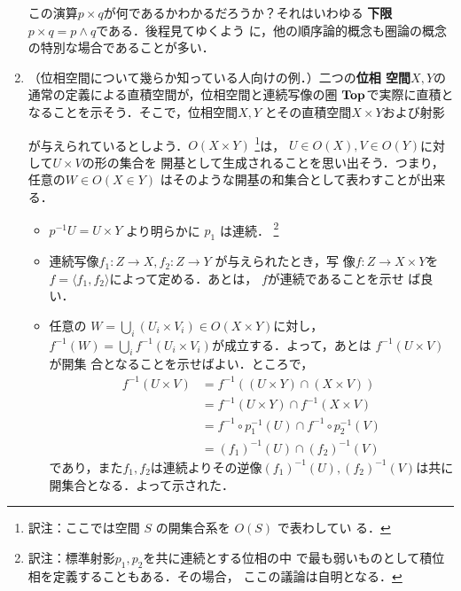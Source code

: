 \begin{enumerate}
       この演算$p\times q$が何であるかわかるだろうか？それはいわゆる
       {\bfseries 下限}$p\times q = p \wedge q$である．後程見てゆくよう
       に，他の順序論的概念も圏論の概念の特別な場合であることが多い．
 \item （位相空間について幾らか知っている人向けの例．）二つの{\bfseries 位相
       空間}$X, Y$の通常の定義による直積空間が，位相空間と連続写像の圏
       ${\bf Top}$で実際に直積となることを示そう．そこで，位相空間$X,Y$
       とその直積空間$X \times Y$および射影
       \begin{center}
       \end{center}
       が与えられているとしよう．$O(X \times Y)$
       \footnote{訳注：ここでは空間 $S$ の開集合系を $O(S)$ で表わしてい
       る．}は， $U\in O(X), V \in O(Y)$に対して$U \times V$の形の集合を
       開基として生成されることを思い出そう．つまり，任意の$W \in O(X\in
       Y)$ はそのような開基の和集合として表わすことが出来る．

       \begin{itemize}
	\item $p^{-1}U = U \times Y$ より明らかに $p_1$ は連続．
	      \footnote{訳注：標準射影$p_1, p_2$を共に連続とする位相の中
	      で最も弱いものとして積位相を定義することもある．その場合，
	      ここの議論は自明となる．}
	\item 連続写像$f_1: Z \to X, f_2: Z \to Y$ が与えられたとき，写
	      像$f: Z \to X \times Y$を $f = \langle f_1, f_2
	      \rangle$によって定める．あとは， $f$が連続であることを示せ
	      ば良い．
	\item 任意の $W = \bigcup_{i} (U_i \times V_i) \in O(X \times
	      Y)$に対し，$f^{-1}(W) = \bigcup_{i} f^{-1}(U_i \times
	      V_i)$が成立する．よって，あとは $f^{-1}(U \times V)$が開集
	      合となることを示せばよい．ところで，
	      \begin{align*}
	       f^{-1}(U \times V)
	       &= f^{-1}((U \times Y) \cap (X \times V))\\
	       &= f^{-1}(U \times Y) \cap f^{-1}(X \times V)\\
	       &= f^{-1} \circ p_1^{-1}(U) \cap f^{-1} \circ
	          p_2^{-1}(V)\\
	       &= (f_1)^{-1}(U) \cap (f_2)^{-1}(V)
	      \end{align*}
	      であり，また$f_1, f_2$は連続よりその逆像$(f_1)^{-1}(U),
	      (f_2)^{-1}(V)$は共に開集合となる．よって示された．


\end{itemize}
\end{enumerate}
